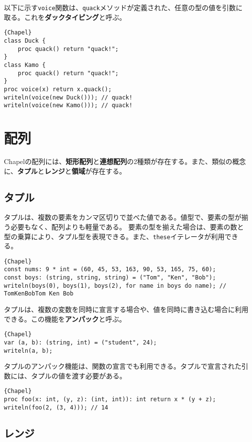 \documentclass[10pt,a4paper]{book}
\begin{document}
以下に示す\texttt{voice}関数は、\texttt{quack}メソッドが定義された、任意の型の値を引数に取る。これを\textbf{ダックタイピング}と呼ぶ。

\begin{Verbatim}{Chapel}
class Duck {
	proc quack() return "quack!";
}
class Kamo {
	proc quack() return "quack!";
}
proc voice(x) return x.quack();
writeln(voice(new Duck())); // quack!
writeln(voice(new Kamo())); // quack!
\end{Verbatim}

\chapter{配列}

Chapelの配列には、\textbf{矩形配列}と\textbf{連想配列}の2種類が存在する。また、類似の概念に、\textbf{タプル}と\textbf{レンジ}と\textbf{領域}が存在する。

\section{タプル}

タプルは、複数の要素をカンマ区切りで並べた値である。値型で、要素の型が揃う必要もなく、配列よりも軽量である。
要素の型を揃えた場合は、要素の数と型の乗算により、タプル型を表現できる。また、\texttt{these}イテレータが利用できる。

\begin{Verbatim}{Chapel}
const nums: 9 * int = (60, 45, 53, 163, 90, 53, 165, 75, 60);
const boys: (string, string, string) = ("Tom", "Ken", "Bob");
writeln(boys(0), boys(1), boys(2), for name in boys do name); // TomKenBobTom Ken Bob
\end{Verbatim}

タプルは、複数の変数を同時に宣言する場合や、値を同時に書き込む場合に利用できる。この機能を\textbf{アンパック}と呼ぶ。

\begin{Verbatim}{Chapel}
var (a, b): (string, int) = ("student", 24);
writeln(a, b);
\end{Verbatim}

タプルのアンパック機能は、関数の宣言でも利用できる。タプルで宣言された引数には、タプルの値を渡す必要がある。

\begin{Verbatim}{Chapel}
proc foo(x: int, (y, z): (int, int)): int return x * (y + z);
writeln(foo(2, (3, 4))); // 14
\end{Verbatim}

\section{レンジ}
\end{document}
